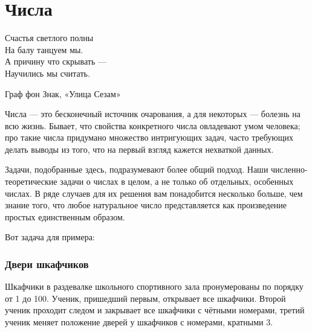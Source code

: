 \chapter*{Числа}


\epigraph{Счастья светлого полны\\                           %
На балу танцуем мы.\\                                %
А причину что скрывать ---\\                 %
Научились мы считать.}{Граф фон Знак, «Улица Сезам»}


    




Числа --- это бесконечный источник  очарования, а для некоторых --- болезнь на всю жизнь. %
Бывает, что свойства конкретного числа овладевают умом человека;
про такие числа придумано множество интригующих задач,
часто требующих делать выводы из того, что на первый взгляд кажется нехваткой данных.




Задачи, подобранные здесь, подразумевают %
более общий подход. %
Наши численно-теоретические задачи о числах в целом, а не только об отдельных, особенных числах. 
В ряде случаев для их решения вам понадобится несколько больше, чем знание того, 
что любое натуральное число представляется как произведение простых единственным образом.

\medskip

Вот задача для примера:


\subsection*{Двери шкафчиков}%

Шкафчики в раздевалке школьного спортивного зала  пронумерованы по порядку от 1 до 100.  Ученик, пришедший первым, открывает все шкафчики.  Второй ученик проходит следом и закрывает все шкафчики с чётными номерами, третий ученик меняет положение дверей у шкафчиков с номерами, кратными 3.

